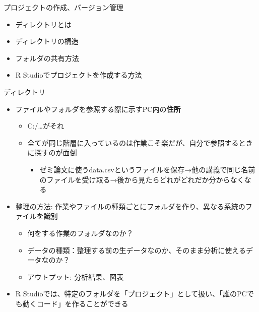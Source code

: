 \documentclass[
  ignorenonframetext,
]{beamer}
\providecommand{\tightlist}{%
  \setlength{\itemsep}{0pt}\setlength{\parskip}{0pt}}
\begin{document}
\begin{frame}{プロジェクトの作成、バージョン管理}
\protect\hypertarget{ux30d7ux30edux30b8ux30a7ux30afux30c8ux306eux4f5cux6210ux30d0ux30fcux30b8ux30e7ux30f3ux7ba1ux7406}{}
\begin{itemize}
\tightlist
\item
  ディレクトリとは
\item
  ディレクトリの構造
\item
  フォルダの共有方法
\item
  R Studioでプロジェクトを作成する方法
\end{itemize}

\begin{block}{ディレクトリ}
\protect\hypertarget{ux30c7ux30a3ux30ecux30afux30c8ux30ea}{}
\begin{itemize}
\tightlist
\item
  ファイルやフォルダを参照する際に示すPC内の\textbf{住所}

  \begin{itemize}
  \tightlist
  \item
    C:/\ldots がそれ
  \item
    全てが同じ階層に入っているのは作業こそ楽だが、自分で参照するときに探すのが面倒

    \begin{itemize}
    \tightlist
    \item
      ゼミ論文に使うdata.csvというファイルを保存→他の講義で同じ名前のファイルを受け取る→後から見たらどれがどれだか分からなくなる
    \end{itemize}
  \end{itemize}
\item
  整理の方法:
  作業やファイルの種類ごとにフォルダを作り、異なる系統のファイルを識別

  \begin{itemize}
  \tightlist
  \item
    何をする作業のフォルダなのか？
  \item
    データの種類：整理する前の生データなのか、そのまま分析に使えるデータなのか？
  \item
    アウトプット: 分析結果、図表
  \end{itemize}
\item
  R
  Studioでは、特定のフォルダを「プロジェクト」として扱い、「誰のPCでも動くコード」を作ることができる
\end{itemize}
\end{block}


\end{frame}
\end{document}
